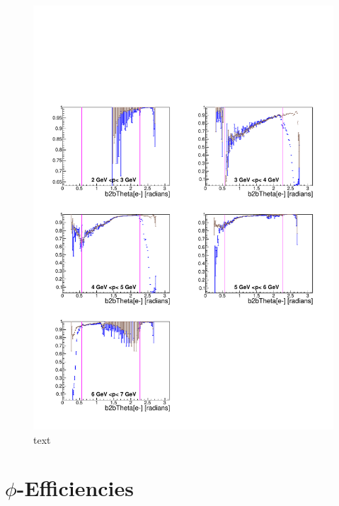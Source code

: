 \documentclass[a4paper,11pt,twosided,final,german,openbib,pdftex,listof=totoc,bibliography=totoc]{scrbook}
\begin{document}
\begin{figure}[!htbp]
	\centering
	\includegraphics[width=\textwidth]{Plots/comp/cMThetaep_Data.pdf}
	\caption[text]{text}
	\label{plt:compThetaep}
\end{figure}

\newpage 

\section{$\phi$-Efficiencies}
\end{document}

